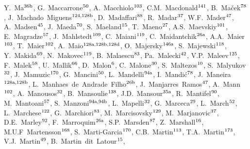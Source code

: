 \begin{flushleft}
Y.~Ma$^\textrm{\scriptsize 36b}$,
G.~Maccarrone$^\textrm{\scriptsize 50}$,
A.~Macchiolo$^\textrm{\scriptsize 103}$,
C.M.~Macdonald$^\textrm{\scriptsize 141}$,
B.~Ma\v{c}ek$^\textrm{\scriptsize 78}$,
J.~Machado~Miguens$^\textrm{\scriptsize 124,128b}$,
D.~Madaffari$^\textrm{\scriptsize 88}$,
R.~Madar$^\textrm{\scriptsize 37}$,
W.F.~Mader$^\textrm{\scriptsize 47}$,
A.~Madsen$^\textrm{\scriptsize 45}$,
J.~Maeda$^\textrm{\scriptsize 70}$,
S.~Maeland$^\textrm{\scriptsize 15}$,
T.~Maeno$^\textrm{\scriptsize 27}$,
A.S.~Maevskiy$^\textrm{\scriptsize 101}$,
E.~Magradze$^\textrm{\scriptsize 57}$,
J.~Mahlstedt$^\textrm{\scriptsize 109}$,
C.~Maiani$^\textrm{\scriptsize 119}$,
C.~Maidantchik$^\textrm{\scriptsize 26a}$,
A.A.~Maier$^\textrm{\scriptsize 103}$,
T.~Maier$^\textrm{\scriptsize 102}$,
A.~Maio$^\textrm{\scriptsize 128a,128b,128d}$,
O.~Majersky$^\textrm{\scriptsize 146a}$,
S.~Majewski$^\textrm{\scriptsize 118}$,
Y.~Makida$^\textrm{\scriptsize 69}$,
N.~Makovec$^\textrm{\scriptsize 119}$,
B.~Malaescu$^\textrm{\scriptsize 83}$,
Pa.~Malecki$^\textrm{\scriptsize 42}$,
V.P.~Maleev$^\textrm{\scriptsize 125}$,
F.~Malek$^\textrm{\scriptsize 58}$,
U.~Mallik$^\textrm{\scriptsize 66}$,
D.~Malon$^\textrm{\scriptsize 6}$,
C.~Malone$^\textrm{\scriptsize 30}$,
S.~Maltezos$^\textrm{\scriptsize 10}$,
S.~Malyukov$^\textrm{\scriptsize 32}$,
J.~Mamuzic$^\textrm{\scriptsize 170}$,
G.~Mancini$^\textrm{\scriptsize 50}$,
L.~Mandelli$^\textrm{\scriptsize 94a}$,
I.~Mandi\'{c}$^\textrm{\scriptsize 78}$,
J.~Maneira$^\textrm{\scriptsize 128a,128b}$,
L.~Manhaes~de~Andrade~Filho$^\textrm{\scriptsize 26b}$,
J.~Manjarres~Ramos$^\textrm{\scriptsize 47}$,
A.~Mann$^\textrm{\scriptsize 102}$,
A.~Manousos$^\textrm{\scriptsize 32}$,
B.~Mansoulie$^\textrm{\scriptsize 138}$,
J.D.~Mansour$^\textrm{\scriptsize 35a}$,
R.~Mantifel$^\textrm{\scriptsize 90}$,
M.~Mantoani$^\textrm{\scriptsize 57}$,
S.~Manzoni$^\textrm{\scriptsize 94a,94b}$,
L.~Mapelli$^\textrm{\scriptsize 32}$,
G.~Marceca$^\textrm{\scriptsize 29}$,
L.~March$^\textrm{\scriptsize 52}$,
L.~Marchese$^\textrm{\scriptsize 122}$,
G.~Marchiori$^\textrm{\scriptsize 83}$,
M.~Marcisovsky$^\textrm{\scriptsize 129}$,
M.~Marjanovic$^\textrm{\scriptsize 37}$,
D.E.~Marley$^\textrm{\scriptsize 92}$,
F.~Marroquim$^\textrm{\scriptsize 26a}$,
S.P.~Marsden$^\textrm{\scriptsize 87}$,
Z.~Marshall$^\textrm{\scriptsize 16}$,
M.U.F~Martensson$^\textrm{\scriptsize 168}$,
S.~Marti-Garcia$^\textrm{\scriptsize 170}$,
C.B.~Martin$^\textrm{\scriptsize 113}$,
T.A.~Martin$^\textrm{\scriptsize 173}$,
V.J.~Martin$^\textrm{\scriptsize 49}$,
B.~Martin~dit~Latour$^\textrm{\scriptsize 15}$,

\end{flushleft}
